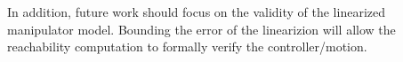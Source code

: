 In addition, future work should focus on the validity of the linearized manipulator model.
Bounding the error of the linearizion will allow the reachability computation to formally verify the controller/motion.





\begin{comment}
The action planning stage of the assembly process is broken down into two parts: modeling the manipulator behavior as a hybrid system and verifying safety conditions of the end effector motions (making sure that undesirable motions do not occur).

\subsection{Hybrid system modeling}
The trajectory planner discussed in the previous section is responsible for moving each arm (trajectory execution) to within some bound of the final desired end effector position (determined by the task planner) for either (i) grasping or (ii) component alignment. 
The trajectory planner provides to the action planner the final positions of the end effectors with respect to the appropriate blocks for (i) grasping, or (ii) alignment at attachment.
In either case, it is beneficial to avoid damaging a robot module or failing to complete a grasp or attachment due to position and alignment errors.
For the proposed scenario of assembling modular robotic components, we implement a system similar to a framework \cite{6016596} developed to address the verification of control architectures for autonomous robotic surgery manipulation tasks with respect to various safety conditions, denoted as $\varphi$, such as avoiding end effector misalignment or excessive force application.

In the previously mentioned framework, the system is modeled as a hybrid automaton \cite{Alur1993}, composed of discrete states (tasks/behaviors) and continuous dynamics associated with each state or behavior.
In our case of modular robot assembly, each state consists of \textit{fast approach}, which is handled by the trajectory planner, and \textit{slow approach}, \textit{alignment}, \textit{grasping}, and \textit{connecting}, handled by the action planner. 
Each state also contains a controller, a set of invariants (conditions required to be true while the automaton is in that state), and a set of guards (conditions that must be true in order for a state transition to take place).


\end{comment}
